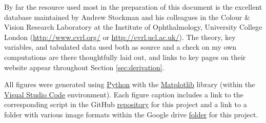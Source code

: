 \documentclass{article}
\begin{document}
By far the resource used most in the preparation of this document is the excellent database maintained by Andrew Stockman and his colleagues in the Colour \& Vision Research Laboratory at the Institute of Ophthalmology, University College London (\url{http://www.cvrl.org/} or \url{http://cvrl.ucl.ac.uk/}).  The theory, key variables, and tabulated data used both as source and a check on my own computations are there thoughtfully laid out, and links to key pages on their website appear throughout Section \ref{sec:derivation}.

All figures were generated using \href{https://www.python.org/}{Python} with the \href{https://matplotlib.org/}{Matplotlib} library (within the \href{https://code.visualstudio.com/}{Visual Studio Code} environment).  Each figure caption includes a link to the corresponding script in the GitHub \href{https://github.com/kyle-c-mcdermott/visualizing-color-space}{repository} for this project and a link to a folder with various image formats within the Google drive \href{https://drive.google.com/drive/folders/1jPUTIYndDIz3u3UEHpQn7Y6sarJDSm_q?usp=sharing}{folder} for this project.
\end{document}
